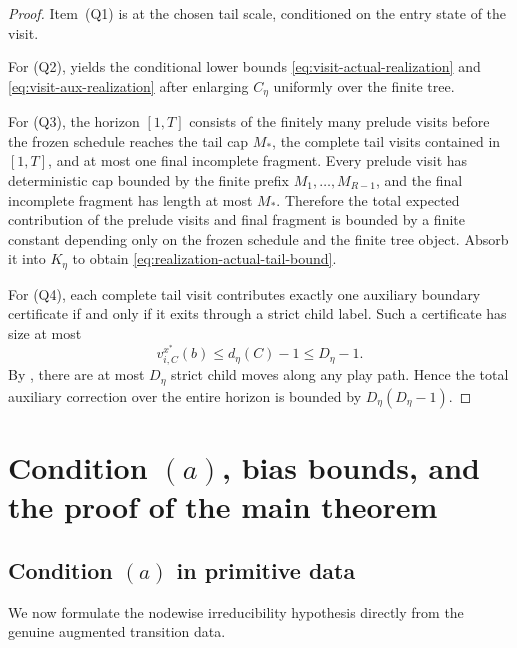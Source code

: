 \documentclass[12pt]{article}
\theoremstyle{definition}
\newcommand{\1}{\mathbf{1}}
\begin{document}
\begin{proof}
Item~(Q1) is  at the chosen tail scale, conditioned on
the entry state of the visit.

For (Q2),  yields the conditional lower bounds
\eqref{eq:visit-actual-realization} and \eqref{eq:visit-aux-realization} after
enlarging $C_\eta$ uniformly over the finite tree.

For (Q3), the horizon $[1,T]$ consists of the finitely many prelude visits before
the frozen schedule reaches the tail cap $M_*$, the complete tail visits
contained in $[1,T]$, and at most one final incomplete fragment. Every prelude
visit has deterministic cap bounded by the finite prefix
$M_1,\dots,M_{R-1}$, and the final incomplete fragment has length at most $M_*$.
Therefore the total expected contribution of the prelude visits and final
fragment is bounded by a finite constant depending only on the frozen schedule
and the finite tree object. Absorb it into $K_\eta$ to obtain
\eqref{eq:realization-actual-tail-bound}.

For (Q4), each complete tail visit contributes exactly one auxiliary boundary
certificate if and only if it exits through a strict child label. Such a
certificate has size at most
\[
v_{i,C}^{x^*}(b)\le d_\eta(C)-1\le D_\eta-1.
\]
By , there are at most $D_\eta$ strict child moves
along any play path. Hence the total auxiliary correction over the entire horizon
is bounded by $D_\eta(D_\eta-1)$.
\end{proof}

\section{Condition \texorpdfstring{$(a)$}{(a)}, bias bounds, and the proof of the main theorem}
\label{sec:proof-main}

\subsection{Condition \texorpdfstring{$(a)$}{(a)} in primitive data}

We now formulate the nodewise irreducibility hypothesis directly from the genuine
augmented transition data.
\end{document}
